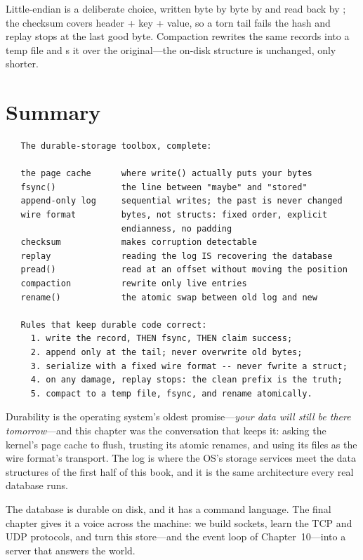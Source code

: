 Little-endian is a deliberate choice, written byte by byte by
 and read back by ; the checksum covers
header + key + value, so a torn tail fails the hash and replay stops
at the last good byte. Compaction rewrites the same records into a
temp file and s it over the original---the on-disk
structure is unchanged, only shorter.

\section{Summary}

\begin{verbatim}
   The durable-storage toolbox, complete:

   the page cache      where write() actually puts your bytes
   fsync()             the line between "maybe" and "stored"
   append-only log     sequential writes; the past is never changed
   wire format         bytes, not structs: fixed order, explicit
                       endianness, no padding
   checksum            makes corruption detectable
   replay              reading the log IS recovering the database
   pread()             read at an offset without moving the position
   compaction          rewrite only live entries
   rename()            the atomic swap between old log and new

   Rules that keep durable code correct:
     1. write the record, THEN fsync, THEN claim success;
     2. append only at the tail; never overwrite old bytes;
     3. serialize with a fixed wire format -- never fwrite a struct;
     4. on any damage, replay stops: the clean prefix is the truth;
     5. compact to a temp file, fsync, and rename atomically.
\end{verbatim}

\begin{osconcept}
Durability is the operating system's oldest promise---\emph{your data
will still be there tomorrow}---and this chapter was the conversation
that keeps it: asking the kernel's page cache to flush, trusting its
atomic renames, and using its files as the wire format's transport.
The log is where the OS's storage services meet the data structures of
the first half of this book, and it is the same architecture every
real database runs.
\end{osconcept}

The database is durable on disk, and it has a command language. The
final chapter gives it a voice across the machine: we build sockets,
learn the TCP and UDP protocols, and turn this store---and the event
loop of Chapter~10---into a server that answers the world.


